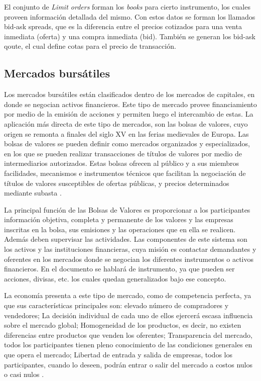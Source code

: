 El conjunto de \emph{Limit orders} forman los \emph{books} para cierto
instrumento, los cuales proveen información detallada del mismo. Con estos
datos se forman los llamados bid-ask spreads, que es la diferencia entre el
precios cotizados para una venta inmediata (oferta) y una compra inmediata
(bid).  También se generan los bid-ask qoute, el cual define cotas para el
precio de transacción.

\subsection{Mercados bursátiles}
Los mercados bursátiles están clasificados dentro de los mercados de capitales,
en donde se negocian activos financieros. Este tipo de mercado provee
financiamiento por medio de la emisión de acciones y permiten luego el
intercambio de estas. La aplicación más directa de este tipo de mercados, son
las bolsas de valores, cuyo origen se remonta a finales del siglo XV en las
ferias medievales de Europa. Las bolsas de valores se pueden definir como
mercados organizados y especializados, en los que se pueden realizar
transacciones de títulos de valores por medio de intermediarios autorizados.
Estas bolsas ofrecen al público y a sus miembros facilidades, mecanismos e
instrumentos técnicos que facilitan la negociación de títulos de valores
susceptibles de ofertas públicas, y precios determinados mediante subasta
\cite{levine1998stock}.

La principal función de las Bolsas de Valores es proporcionar a los
participantes información objetiva, completa y permanente de los valores y las
empresas inscritas en la bolsa, sus emisiones y las operaciones que en ella se
realicen. Además deben supervisar las actividades. Las componentes de este
sistema son los activos y las instituciones financieras, cuya misión es
contactar demandantes y oferentes en los mercados donde se negocian los
diferentes instrumentos o activos financieros. En el documento se hablará de
instrumento, ya que pueden ser acciones, divisas, etc. los cuales quedan
generalizados bajo ese concepto.

La economía presenta a este tipo de mercado, como de competencia perfecta, ya
que sus características principales son: elevado número de compradores y
vendedores; La decisión individual de cada uno de ellos ejercerá escasa
influencia sobre el mercado global; Homogeneidad de los productos, es decir, no
existen diferencias entre productos que venden los oferentes; Transparencia del
mercado, todos los participantes tienen pleno conocimiento de las condiciones
generales en que opera el mercado; Libertad de entrada y salida de empresas,
todos los participantes, cuando lo deseen, podrán entrar o salir del mercado a
costos nulos o casi nulos \cite{mankiw2011principles}. 

